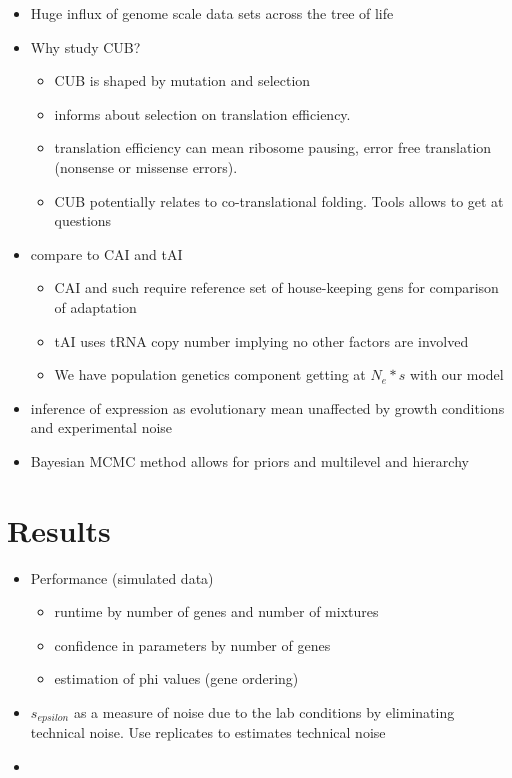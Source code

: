 \documentclass{bioinfo}
\begin{document}
\begin{itemize}
\item Huge influx of genome scale data sets across the tree of life
\item Why study CUB?
	\begin{itemize}
	\item CUB is shaped by mutation and selection
	\item informs about selection on translation efficiency.
	\item translation efficiency can mean ribosome pausing, error free translation (nonsense or missense errors).
	\item CUB potentially relates to co-translational folding. Tools allows to get at questions
	\end{itemize}
\item compare to CAI and tAI
	\begin{itemize}
	\item CAI and such require reference set of house-keeping gens for comparison of adaptation
	\item tAI uses tRNA copy number implying no other factors are involved
	\item We have population genetics component getting at $N_e * s$ with our model
	\end{itemize}
\item inference of expression as evolutionary mean unaffected by growth conditions and experimental noise
\item Bayesian MCMC method allows for priors and multilevel and hierarchy 
\end{itemize}



\section*{Results}
\begin{itemize}
\item Performance (simulated data)
	\begin{itemize}
	\item runtime by number of genes and number of mixtures
	\item confidence in parameters by number of genes
	\item estimation of phi values (gene ordering)
	\end{itemize}
\item $s_{epsilon}$ as a measure of noise due to the lab conditions by eliminating technical 			noise. Use replicates to estimates technical noise

\item 
\end{itemize}
\end{document}

